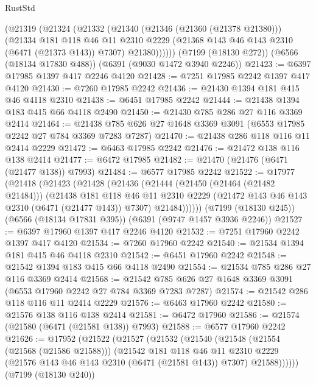 \begin{lexlean}{RustStd}
\begin{coremodule}
{\begin{coremodule}
{{{{{{{{{{{{{{{{{{{{{{{{{{      (@21319
        (@21324
          (@21332
            (@21340
              (@21346 (@21360 (@21378 @21380)))
              (@21334
                @181
                @118
                @46
                @11
                @2310
                @2229
                (@21368 @143 @46 @143 @2310 (@6471 (@21373 @143)) @7307)
                @21380))))))
    (@7199 (@18130 @272))
    (@6566 (@18134 @17830 @488))
    (@6391 (@9030 @1472 @3940 @2246))
@21423 := @6397 @17985 @1397 @417 @2246 @4120
@21428 := @7251 @17985 @2242 @1397 @417 @4120
@21430 := @7260 @17985 @2242
@21436 := @21430 @1394 @181 @415 @46 @4118 @2310
@21438 := @6451 @17985 @2242
@21444 := @21438 @1394 @183 @415 @66 @4118 @2490
@21450 := @21430 @785 @286 @27 @116 @3369 @2414
@21464 := @21438 @785 @626 @27 @1648 @3369 @3091 (@6553 @17985 @2242 @27 @784 @3369 @7283 @7287)
@21470 := @21438 @286 @118 @116 @11 @2414 @2229
@21472 := @6463 @17985 @2242
@21476 := @21472 @138 @116 @138 @2414
@21477 := @6472 @17985
@21482 := @21470 (@21476 (@6471 (@21477 @138)) @7993)
@21484 := @6577 @17985 @2242
@21522 := @17977
    (@21418
      (@21423
        (@21428
          (@21436
            (@21444
              (@21450 (@21464 (@21482 @21484)))
              (@21438
                @181
                @118
                @46
                @11
                @2310
                @2229
                (@21472 @143 @46 @143 @2310 (@6471 (@21477 @143)) @7307)
                @21484))))))
    (@7199 (@18130 @245))
    (@6566 (@18134 @17831 @395))
    (@6391 (@9747 @1457 @3936 @2246))
@21527 := @6397 @17960 @1397 @417 @2246 @4120
@21532 := @7251 @17960 @2242 @1397 @417 @4120
@21534 := @7260 @17960 @2242
@21540 := @21534 @1394 @181 @415 @46 @4118 @2310
@21542 := @6451 @17960 @2242
@21548 := @21542 @1394 @183 @415 @66 @4118 @2490
@21554 := @21534 @785 @286 @27 @116 @3369 @2414
@21568 := @21542 @785 @626 @27 @1648 @3369 @3091 (@6553 @17960 @2242 @27 @784 @3369 @7283 @7287)
@21574 := @21542 @286 @118 @116 @11 @2414 @2229
@21576 := @6463 @17960 @2242
@21580 := @21576 @138 @116 @138 @2414
@21581 := @6472 @17960
@21586 := @21574 (@21580 (@6471 (@21581 @138)) @7993)
@21588 := @6577 @17960 @2242
@21626 := @17952
    (@21522
      (@21527
        (@21532
          (@21540
            (@21548
              (@21554 (@21568 (@21586 @21588)))
              (@21542
                @181
                @118
                @46
                @11
                @2310
                @2229
                (@21576 @143 @46 @143 @2310 (@6471 (@21581 @143)) @7307)
                @21588))))))
    (@7199 (@18130 @240))
}}}}}}}}}}}}}}}}}}}}}}}}}}
\end{coremodule}}
\end{coremodule}
\end{lexlean}

